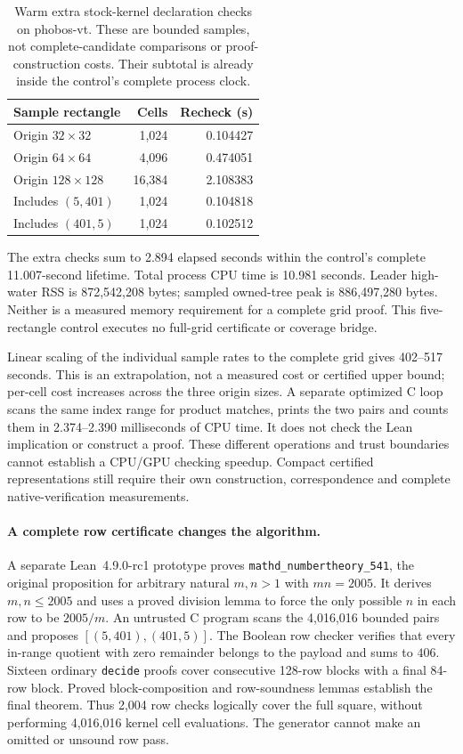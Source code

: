 \documentclass[10pt,twocolumn]{article}
\begin{document}
\begin{table}[t]
\centering
\small
\begin{tabular}{@{}lrr@{}}
\toprule
Sample rectangle & Cells & Recheck (s) \\
\midrule
Origin $32\times32$ & 1,024 & 0.104427 \\
Origin $64\times64$ & 4,096 & 0.474051 \\
Origin $128\times128$ & 16,384 & 2.108383 \\
Includes $(5,401)$ & 1,024 & 0.104818 \\
Includes $(401,5)$ & 1,024 & 0.102512 \\
\bottomrule
\end{tabular}
\caption{Warm extra stock-kernel declaration checks on phobos-vt. These are
bounded samples, not complete-candidate comparisons or proof-construction
costs. Their subtotal is already inside the control's complete process clock.}
\label{tab:grid-kernel-samples}
\end{table}

The extra checks sum to 2.894 elapsed seconds within the control's complete
11.007-second lifetime. Total process CPU time is 10.981 seconds.
Leader high-water RSS is 872,542,208 bytes;
sampled owned-tree peak is 886,497,280 bytes. Neither is a measured memory
requirement for a complete grid proof. This five-rectangle control executes
no full-grid certificate or coverage bridge.

Linear scaling of the individual sample rates to the complete grid gives
402--517 seconds. This is an extrapolation, not a measured cost or certified
upper bound; per-cell cost increases across the three origin sizes.
A separate optimized C loop scans the same index range for product matches,
prints the two pairs and counts them in 2.374--2.390 milliseconds of CPU time.
It does not check the Lean implication or construct a proof. These different
operations and trust boundaries cannot establish a CPU/GPU checking speedup.
Compact certified representations still require their own construction,
correspondence and complete native-verification measurements.

\paragraph{A complete row certificate changes the algorithm.}
A separate Lean~4.9.0-rc1 prototype proves
\texttt{mathd\_numbertheory\_541}, the original proposition for arbitrary
natural $m,n>1$ with $mn=2005$. It derives $m,n\leq2005$ and uses a proved
division lemma to force the only possible $n$ in each row to be $2005/m$.
An untrusted C program scans the 4,016,016 bounded pairs and proposes
$[(5,401),(401,5)]$. The Boolean row checker verifies that every in-range
quotient with zero remainder belongs to the payload and sums to $406$.
Sixteen ordinary \texttt{decide} proofs cover consecutive 128-row blocks
with a final 84-row block. Proved block-composition and row-soundness lemmas
establish the final theorem. Thus 2,004 row checks logically cover the full
square, without performing 4,016,016 kernel cell evaluations.
The generator cannot make an omitted or unsound row pass.
\end{document}
